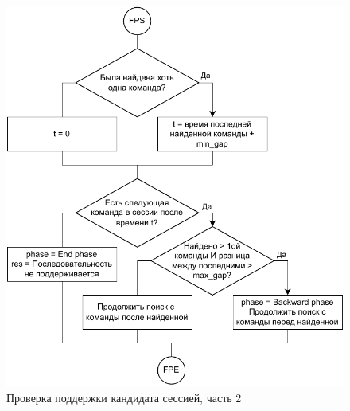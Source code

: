 \newpage
\begin{figure}[h!]
	\centering
	\includegraphics[width=1\textwidth]{inc/img/forward_phase.drawio.pdf}
	\caption{Проверка поддержки кандидата сессией, часть 2}
	\label{forward_phase}
\end{figure}

